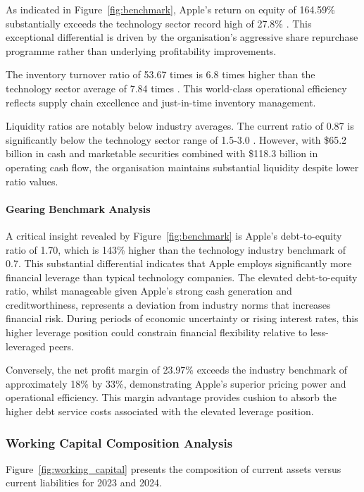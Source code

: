 \documentclass[12pt,a4paper]{article}
\begin{document}
As indicated in Figure~\ref{fig:benchmark}, Apple's return on equity of 164.59\% substantially exceeds the technology sector record high of 27.8\% \citep{linkedin2024}. This exceptional differential is driven by the organisation's aggressive share repurchase programme rather than underlying profitability improvements.

The inventory turnover ratio of 53.67 times is 6.8 times higher than the technology sector average of 7.84 times \citep{unleashed2024}. This world-class operational efficiency reflects supply chain excellence and just-in-time inventory management.

Liquidity ratios are notably below industry averages. The current ratio of 0.87 is significantly below the technology sector range of 1.5-3.0 \citep{techfunnel2024}. However, with \$65.2 billion in cash and marketable securities combined with \$118.3 billion in operating cash flow, the organisation maintains substantial liquidity despite lower ratio values.

\paragraph{Gearing Benchmark Analysis}

A critical insight revealed by Figure~\ref{fig:benchmark} is Apple's debt-to-equity ratio of 1.70, which is 143\% higher than the technology industry benchmark of 0.7. This substantial differential indicates that Apple employs significantly more financial leverage than typical technology companies. The elevated debt-to-equity ratio, whilst manageable given Apple's strong cash generation and creditworthiness, represents a deviation from industry norms that increases financial risk. During periods of economic uncertainty or rising interest rates, this higher leverage position could constrain financial flexibility relative to less-leveraged peers.

Conversely, the net profit margin of 23.97\% exceeds the industry benchmark of approximately 18\% by 33\%, demonstrating Apple's superior pricing power and operational efficiency. This margin advantage provides cushion to absorb the higher debt service costs associated with the elevated leverage position.

\subsubsection{Working Capital Composition Analysis}

Figure~\ref{fig:working_capital} presents the composition of current assets versus current liabilities for 2023 and 2024.
\end{document}
